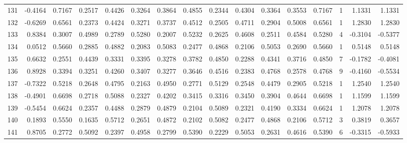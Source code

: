 \begin{tabular}{lrrrrrrrrrrrrrrr}
131 &     -0.4164 &  0.7167 &  0.2517 &  0.4426 &  0.3264 &  0.3864 &  0.4855 &  0.2344 &  0.4304 &  0.3364 &   0.3553 &     0.7167 &      1 &                    1.1331 &                     1.1331 \\
132 &     -0.6269 &  0.6561 &  0.2373 &  0.4424 &  0.3271 &  0.3737 &  0.4512 &  0.2505 &  0.4711 &  0.2904 &   0.5008 &     0.6561 &      1 &                    1.2830 &                     1.2830 \\
133 &      0.8384 &  0.3007 &  0.4989 &  0.2789 &  0.5280 &  0.2007 &  0.5232 &  0.2625 &  0.4608 &  0.2511 &   0.4584 &     0.5280 &      4 &                   -0.3104 &                    -0.5377 \\
134 &      0.0512 &  0.5660 &  0.2885 &  0.4882 &  0.2083 &  0.5083 &  0.2477 &  0.4868 &  0.2106 &  0.5053 &   0.2690 &     0.5660 &      1 &                    0.5148 &                     0.5148 \\
135 &      0.6632 &  0.2551 &  0.4439 &  0.3331 &  0.3395 &  0.3278 &  0.3782 &  0.4850 &  0.2288 &  0.4341 &   0.3716 &     0.4850 &      7 &                   -0.1782 &                    -0.4081 \\
136 &      0.8928 &  0.3394 &  0.3251 &  0.4260 &  0.3407 &  0.3277 &  0.3646 &  0.4516 &  0.2383 &  0.4768 &   0.2578 &     0.4768 &      9 &                   -0.4160 &                    -0.5534 \\
137 &     -0.7322 &  0.5218 &  0.2648 &  0.4795 &  0.2163 &  0.4950 &  0.2771 &  0.5129 &  0.2548 &  0.4479 &   0.2905 &     0.5218 &      1 &                    1.2540 &                     1.2540 \\
138 &     -0.4901 &  0.6698 &  0.2718 &  0.5088 &  0.2327 &  0.4202 &  0.3415 &  0.3316 &  0.3450 &  0.3904 &   0.4644 &     0.6698 &      1 &                    1.1599 &                     1.1599 \\
139 &     -0.5454 &  0.6624 &  0.2357 &  0.4488 &  0.2879 &  0.4879 &  0.2104 &  0.5089 &  0.2321 &  0.4190 &   0.3334 &     0.6624 &      1 &                    1.2078 &                     1.2078 \\
140 &      0.1893 &  0.5550 &  0.1635 &  0.5712 &  0.2651 &  0.4872 &  0.2102 &  0.5082 &  0.2477 &  0.4868 &   0.2106 &     0.5712 &      3 &                    0.3819 &                     0.3657 \\
141 &      0.8705 &  0.2772 &  0.5092 &  0.2397 &  0.4958 &  0.2799 &  0.5390 &  0.2229 &  0.5053 &  0.2631 &   0.4616 &     0.5390 &      6 &                   -0.3315 &                    -0.5933 \\

\end{tabular}
